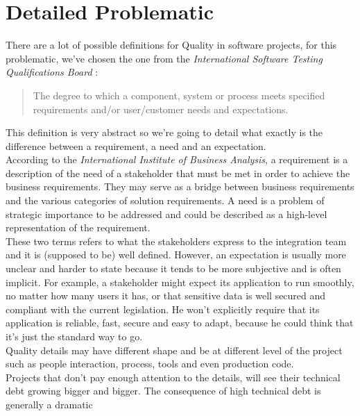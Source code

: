 \section{Detailed Problematic}\label{sec:detailed-problematic}
There are a lot of possible definitions for Quality in software projects, for
this problematic, we've chosen the one from the \textit{International Software
Testing Qualifications Board} :
\begin{quote}
The degree to which a component, system or process meets specified
requirements and/or user/customer needs and expectations.
\end{quote}
This definition is very abstract so we're going to detail what exactly is the
difference between a requirement, a need and an expectation. \\
According to the \textit{International Institute of Business Analysis}, a
requirement is a description of the need of a stakeholder that must be met in
order to achieve the business requirements.
They may serve as a bridge between business requirements and the various
categories of solution requirements.
A need is a problem of strategic importance to be addressed and could be
described as a high-level representation of the requirement. \\
These two terms refers to what the stakeholders express to the integration
team and it is (supposed to be) well defined.
However, an expectation is usually more unclear and harder to state because
it tends to be more subjective and is often implicit.
For example, a stakeholder might expect its application to run smoothly, no
matter how many users it has, or that sensitive data is well secured and
compliant with the current legislation.
He won't explicitly require that its application is reliable, fast, secure
and easy to adapt, because he could think that it's just the standard way to go.
\\
Quality details may have different shape and be at different level of the
project such as people interaction, process, tools and even production code. \\
\newline
Projects that don't pay enough attention to the details, will see their
technical debt growing bigger and bigger.
The consequence of high technical debt is generally a dramatic
